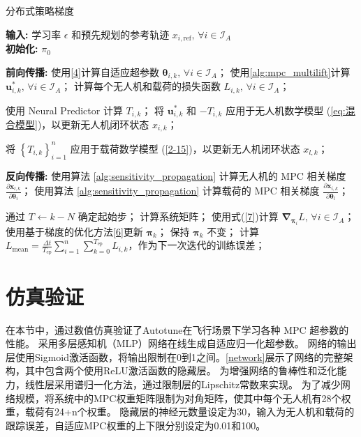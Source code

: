 \documentclass[lang=chs, degree=master, blindreview=false, winfonts=true]{yanputhesis}
\begin{document}
\begin{algorithm}[H]
	\linespread{1.2}\selectfont %
	\caption{分布式策略梯度}
	\label{alg:distributed_pg}
	\textbf{输入:} 学习率 $\epsilon$ 和预先规划的参考轨迹 $x_{i,{\text{ref}}}, \, \forall i \in \mathcal{I}_A$\\
	\textbf{初始化:} $\pi_0$
	
	\begin{algorithmic}[1]
		\State \textbf{前向传播:}
		\State 使用\autoref{4}计算自适应超参数 $\bm{\theta}_{i,k}, \, \forall i \in \mathcal{I}_A$；
		\State 使用\autoref{alg:mpc_multilift}计算 $\bm{u}_{i,k}^{\ast}, \, \forall i \in \mathcal{I}_A$；
		\State 计算每个无人机和载荷的损失函数 $L_{i,k}, \, \forall i \in \mathcal{I}_A$；
		
		\State 使用 Neural Predictor 计算 $T_{i,k}$；
		\State 将 $\bm{u}_{i,k}^{\ast}$ 和 $-T_{i,k}$ 应用于无人机数学模型 (\ref{eq:混合模型})，以更新无人机闭环状态 $x_{i,k}$；
		\EndFor
		
		\State 将 $\left\{ T_{i,k} \right\}_{i=1}^n$ 应用于载荷数学模型 (\ref{2-15})，以更新无人机闭环状态 $x_{l,k}$；
		
		\State \textbf{反向传播:}
		\State 使用算法 \ref{alg:sensitivity_propagation} 计算无人机的 MPC 相关梯度 $\frac{\partial \bm{x}_{l,k}}{\partial \bm{\theta}_i}$；
		\State 使用算法 \ref{alg:sensitivity_propagation} 计算载荷的 MPC 相关梯度 $\frac{\partial \bm{x}_{i,k}}{\partial \bm{\theta}_l}$；
		\EndFor
		
		\State 通过 $T_{\text{}} \gets k - N$ 确定起始步；
		\State 计算系统矩阵；
		\State 使用式(\ref{7})计算 $\bm{\nabla}_{\bm{\pi}_i} L, \, \forall i \in \mathcal{I}_A$；
		\State 使用基于梯度的优化方法\autoref{6}更新 $\bm{\pi}_k$；
		\Else
		\State 保持 $\bm{\pi}_k$ 不变；
		\EndIf
		\EndFor
		\State 计算 $L_{\text{mean}} = \frac{\Delta t}{T_{\text{ep}}} \sum_{i=1}^n \sum_{k=0}^{T_{\text{ep}}} L_{i,k}$，作为下一次迭代的训练误差；
		\EndWhile
	\end{algorithmic}
\end{algorithm}

\section{仿真验证}
在本节中，通过数值仿真验证了Autotune在飞行场景下学习各种 MPC 超参数的性能。 采用多层感知机（MLP）网络在线生成自适应归一化超参数。 网络的输出层使用Sigmoid激活函数，将输出限制在0到1之间。\autoref{network}展示了网络的完整架构，其中包含两个使用ReLU激活函数的隐藏层。 为增强网络的鲁棒性和泛化能力，线性层采用谱归一化方法，通过限制层的Lipschitz常数来实现。 为了减少网络规模，将系统中的MPC权重矩阵限制为对角矩阵，使其中每个无人机有28个权重，载荷有24+n个权重。 隐藏层的神经元数量设定为30，输入为无人机和载荷的跟踪误差，自适应MPC权重的上下限分别设定为0.01和100。
\end{document}
